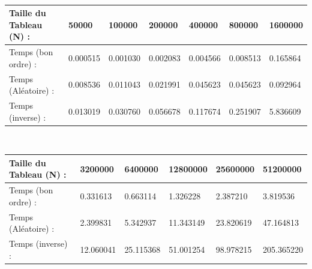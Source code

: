 \documentclass[12pt]{article}
\begin{document}
\color{blue}
\textrm{  }
\\
\begin{tabular}{|p{4cm}||p{1.8cm}|p{1.8cm}|p{1.8cm}|p{1.8cm}|p{1.8cm}|p{1.8cm}|}
\hline
Taille du Tableau (N) : & 50000 & 100000 & 200000 & 400000 & 800000  & 1600000\\
\hline
Temps (bon ordre) : & 0.000515 & 0.001030 & 0.002083 & 0.004566 & 0.008513 & 0.165864  \\
\hline

Temps (Aléatoire) : & 0.008536 & 0.011043 & 0.021991 & 0.045623 & 0.045623 & 0.092964 \\
\hline

Temps (inverse) :  & 0.013019 & 0.030760 & 0.056678 & 0.117674 & 0.251907 & 5.836609  \\
\hline

\end{tabular}
\\
\begin{tabular}{|p{4cm}||p{2.25cm}|p{2.25cm}|p{2.25cm}|p{2.25cm}|p{2.25cm}|}
\hline
Taille du Tableau (N) : & 3200000 & 6400000 & 12800000 & 25600000 &  51200000  \\
\hline

Temps (bon ordre) : & 0.331613 & 0.663114 & 1.326228 & 2.387210 & 3.819536   \\
\hline

Temps (Aléatoire) : & 2.399831 & 5.342937 & 11.343149 & 23.820619 & 47.164813 \\
\hline

Temps (inverse) :  & 12.060041 & 25.115368 & 51.001254 & 98.978215 & 205.365220  \\
\hline

\end{tabular}
\color{black}
\end{document}
